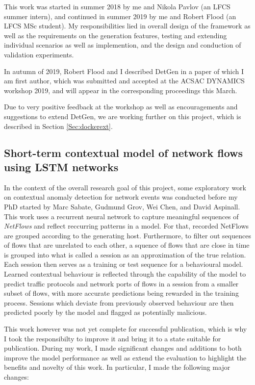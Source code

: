 \documentclass[a4paper,12pt,twoside]{article}
\begin{document}
This work was started in summer 2018 by me and Nikola Pavlov (an LFCS summer intern), and continued in summer 2019 by me and Robert Flood (an LFCS MSc student). My responsibilities lied in overall design of the framework as well as the requirements on the generation features, testing and extending individual scenarios as well as implemention, and the design and conduction of validation experiments. 

In autumn of 2019, Robert Flood and I described DetGen in a paper of which I am first author, which was submitted and accepted at the ACSAC DYNAMICS workshop 2019, and will appear in the corresponding proceedings this March. 

Due to very positive feedback at the workshop as well as encouragements and suggestions to extend DetGen, we are working further on this project, which is described in Section \ref{Sec:dockerext}.

\subsection{Short-term contextual model of network flows using LSTM networks}\label{Sec:Short-term}

In the context of the overall research goal of this project, some exploratory work on contextual anomaly detection for network events was conducted before my PhD started by Marc Sabate, Gudmund Grov, Wei Chen, and David Aspinall. 
This work uses a recurrent neural network to capture meaningful sequences of \textit{NetFlows} and reflect reccurring patterns in a model. For that, recorded NetFlows are grouped according to the generating host. Furthermore, to filter out sequences of flows that are unrelated to each other, a squence of flows that are close in time is grouped into what is called a session as an approximation of the true relation. Each session then serves as a training or test sequence for a behavioural model. Learned contextual behaviour is reflected through the capability of the model to predict traffic protocols and network ports of flows in a session from a smaller subset of flows, with more accurate predictions being rewarded in the training process. Sessions which deviate from previously observed behaviour are then predicted poorly by the model and flagged as potentially malicious.

This work however was not yet complete for successful publication, which is why I took the responsibilty to improve it and bring it to a state suitable for publication. During my work, I made significant changes and additions to both improve the model performance as well as extend the evaluation to highlight the benefits and novelty of this work. 
In particular, I made the following major changes:
\end{document}
